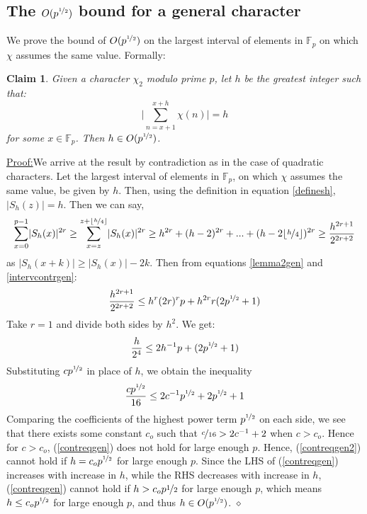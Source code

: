 \documentclass{report}
\newtheorem*{claim*}{Claim}
\newenvironment{claimproof}[1]{\vspace{2.5mm}\par\noindent\underline{Proof:}\space#1}{\hfill $\diamond$ \vspace{2.5mm} \par}
\begin{document}
\subsection{The $O(p^{\nicefrac{1}{2}})$ bound for a general character}
We prove the bound of $O(p^{\nicefrac{1}{2}})$ on the largest interval of elements in $\mathbb{F}_p$ on which $\chi$ assumes the same value. Formally:
\begin{claim*}
Given a character $\chi_2$ modulo prime $p$, let $h$ be the greatest integer such that:
\[\bigg\lvert\sum\limits_{n=x+1}^{x+h}\chi(n)\bigg\rvert=h\]
 for some $x\in\mathbb{F}_p$. Then $h\in O(p^{\nicefrac{1}{2}})$.
\end{claim*}
\begin{claimproof}
We arrive at the result by contradiction as in the case of quadratic characters. Let the largest interval of elements in $\mathbb{F}_p$, on which $\chi$ assumes the same value, be given by $h$. Then, using the definition in equation \ref{definesh}, $\lvert S_h(z)\rvert=h$. Then we can say,
\begin{equation} \label{intervcontrgen}
\sum\limits_{x=0}^{p-1}\lvert S_h(x)\rvert^{2r}\geq\sum\limits_{x=z}^{z+\lfloor\nicefrac{h}{4}\rfloor}\lvert S_h(x)\rvert^{2r} \geq h^{2r}+(h-2)^{2r}+...+(h-2\lfloor\nicefrac{h}{4}\rfloor)^{2r} \geq \frac{h^{2r+1}}{2^{2r+2}}
\end{equation}
as $\lvert S_h(x+k)\rvert \geq \lvert S_h(x)\rvert-2k$. Then from equations \ref{lemma2gen} and \ref{intervcontrgen}:
$$ \frac{h^{2r+1}}{2^{2r+2}} \leq h^{r}(2r)^{r}p+h^{2r}r(2p^{\nicefrac{1}{2}}+1)$$
Take $r=1$ and divide both sides by $h^{2}$. We get:
\begin{equation} \label{contreqgen}
\frac{h}{2^{4}} \leq 2h^{-1}p+(2p^{\nicefrac{1}{2}}+1)
\end{equation}
Substituting $cp^{\nicefrac{1}{2}}$ in place of $h$, we obtain the inequality
\begin{equation} \label{contreqgen2}
\frac{cp^{\nicefrac{1}{2}}}{16} \leq 2c^{-1}p^{\nicefrac{1}{2}}+2p^{\nicefrac{1}{2}}+1
\end{equation}
Comparing the coefficients of the highest power term $p^{\nicefrac{1}{2}}$ on each side, we see that there exists some constant $c_o$ such that $\nicefrac{c}{16}>2c^{-1}+2$ when $c>c_o$. Hence for $c>c_o$, (\ref{contreqgen}) does not hold for large enough $p$. Hence, (\ref{contreqgen2}) cannot hold if $h=c_op^{\nicefrac{1}{2}}$ for large enough $p$. Since the LHS of (\ref{contreqgen}) increases with increase in $h$, while the RHS decreases with increase in $h$, (\ref{contreqgen}) cannot hold if $h>c_op{\nicefrac{1}{2}}$ for large enough $p$, which means $h\leq c_op^{\nicefrac{1}{2}}$ for large enough $p$, and thus $h\in O(p^{\nicefrac{1}{2}})$.
\end{claimproof}
\end{document}
